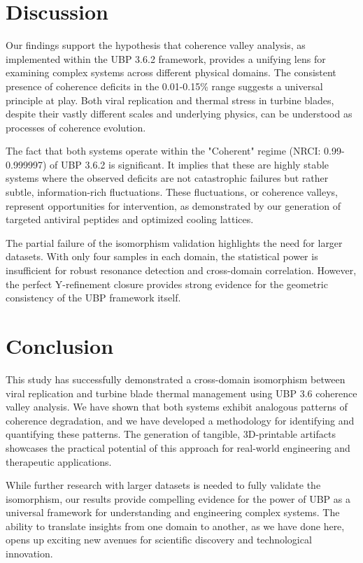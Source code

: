 \documentclass[11pt, a4paper]{article}
\begin{document}
\section{Discussion}

Our findings support the hypothesis that coherence valley analysis, as implemented within the UBP 3.6.2 framework, provides a unifying lens for examining complex systems across different physical domains. The consistent presence of coherence deficits in the 0.01-0.15\% range suggests a universal principle at play. Both viral replication and thermal stress in turbine blades, despite their vastly different scales and underlying physics, can be understood as processes of coherence evolution.

The fact that both systems operate within the "Coherent" regime (NRCI: 0.99-0.999997) of UBP 3.6.2 is significant. It implies that these are highly stable systems where the observed deficits are not catastrophic failures but rather subtle, information-rich fluctuations. These fluctuations, or coherence valleys, represent opportunities for intervention, as demonstrated by our generation of targeted antiviral peptides and optimized cooling lattices.

The partial failure of the isomorphism validation highlights the need for larger datasets. With only four samples in each domain, the statistical power is insufficient for robust resonance detection and cross-domain correlation. However, the perfect Y-refinement closure provides strong evidence for the geometric consistency of the UBP framework itself.

\section{Conclusion}

This study has successfully demonstrated a cross-domain isomorphism between viral replication and turbine blade thermal management using UBP 3.6 coherence valley analysis. We have shown that both systems exhibit analogous patterns of coherence degradation, and we have developed a methodology for identifying and quantifying these patterns. The generation of tangible, 3D-printable artifacts showcases the practical potential of this approach for real-world engineering and therapeutic applications.

While further research with larger datasets is needed to fully validate the isomorphism, our results provide compelling evidence for the power of UBP as a universal framework for understanding and engineering complex systems. The ability to translate insights from one domain to another, as we have done here, opens up exciting new avenues for scientific discovery and technological innovation.
\end{document}
